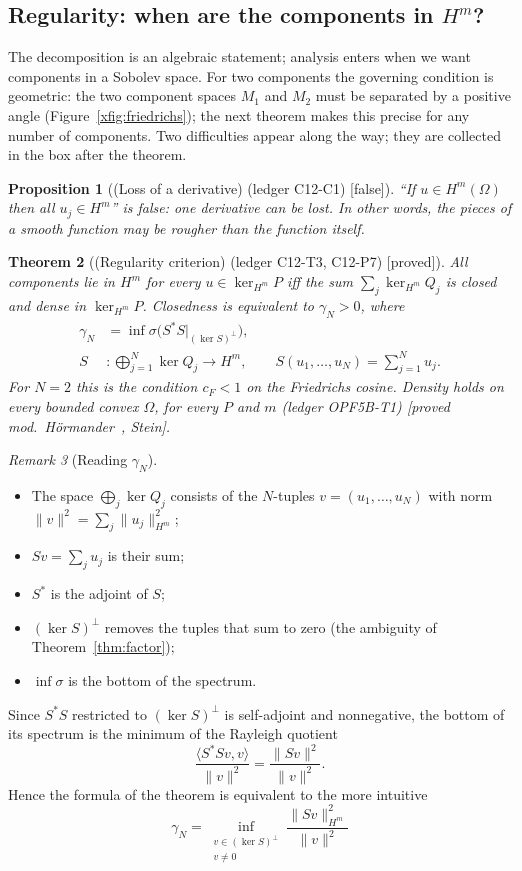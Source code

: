 \documentclass[11pt]{article}
\theoremstyle{plain}
\newtheorem{theorem}{Theorem}[section]
\newtheorem{proposition}[theorem]{Proposition}
\theoremstyle{definition}
\theoremstyle{remark}
\newtheorem{remark}[theorem]{Remark}
\newcommand{\badge}[2]{\textcolor{#1}{\textsf{\footnotesize[#2]}}}
\newcommand{\proved}[1][]{\badge{cC}{proved#1}}
\newcommand{\modulo}[1]{\badge{cD}{proved mod.\ #1}}
\newcommand{\falsest}{\badge{cB}{false}}
\newcommand{\led}[1]{\textcolor{cG}{\textsf{\footnotesize(ledger #1)}}}
\newenvironment{notebox}[1]{\begin{remark}[#1]}{\end{remark}}
\begin{document}
\subsection{Regularity: when are the components in $H^m$?}\label{ch:regular}
The decomposition is an algebraic statement; analysis enters when we want components in a Sobolev space. For two components the governing condition is geometric: the two component spaces $M_1$ and $M_2$ must be separated by a positive angle (Figure~\ref{xfig:friedrichs}); the next theorem makes this precise for any number of components. Two difficulties appear along the way; they are collected in the box after the theorem.
\begin{proposition}[{(Loss of a derivative) \led{C12-C1} \falsest}]\label{prop:loss}\label{cex:loss}
``If $u\in H^m(\Omega)$ then all $u_j\in H^m$'' is false: one derivative can be lost. In other words, the pieces of a smooth function may be rougher than the function itself.
\end{proposition}
\begin{theorem}[{(Regularity criterion) \led{C12-T3, C12-P7} \proved[]}]\label{xthm:hm}
All components lie in $H^m$ for every $u\in\ker_{H^m}P$ iff the sum $\sum_j\ker_{H^m}Q_j$ is \emph{closed} and \emph{dense} in $\ker_{H^m}P$. Closedness is equivalent to $\gamma_N>0$, where
\[
\begin{aligned}
\gamma_N&=\inf\sigma\big(S^*S\big|_{(\ker S)^\perp}\big),\\
S&:\bigoplus_{j=1}^N\ker Q_j\to H^m,\qquad S(u_1,\dots,u_N)=\sum_{j=1}^Nu_j .
\end{aligned}
\]
For $N=2$ this is the condition $c_F<1$ on the Friedrichs cosine. Density holds on every bounded convex $\Omega$, for every $P$ and $m$ \led{OPF5B-T1} \modulo{H\"ormander~\cite{ho}, Stein}.
\end{theorem}
\begin{notebox}{Reading $\gamma_N$}
\begin{itemize}[nosep]
\item The space $\bigoplus_j\ker Q_j$ consists of the $N$-tuples $v=(u_1,\dots,u_N)$ with norm $\|v\|^2=\sum_j\|u_j\|_{H^m}^2$;
\item $Sv=\sum_ju_j$ is their sum;
\item $S^*$ is the adjoint of $S$;
\item $(\ker S)^\perp$ removes the tuples that sum to zero (the ambiguity of Theorem~\ref{thm:factor});
\item $\inf\sigma$ is the bottom of the spectrum.
\end{itemize}
Since $S^*S$ restricted to $(\ker S)^\perp$ is self-adjoint and nonnegative, the bottom of its spectrum is the minimum of the Rayleigh quotient
\[
\frac{\langle S^*Sv,v\rangle}{\|v\|^2}=\frac{\|Sv\|^2}{\|v\|^2}.
\]
Hence the formula of the theorem is equivalent to the more intuitive
\[
\boxed{\ \gamma_N=\inf_{\substack{v\in(\ker S)^\perp\\ v\ne0}}\frac{\|Sv\|_{H^m}^2}{\|v\|^2}\ }
\]
\end{notebox}
\end{document}
